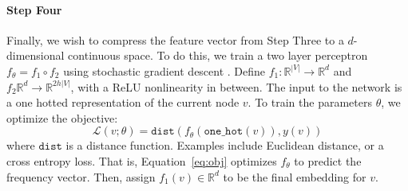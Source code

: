 \documentclass[11pt,a4paper]{article}
\begin{document}
\paragraph{Step Four} Finally, we wish to compress the feature vector from Step Three to a $d$-dimensional continuous space. To do this, we train a two layer perceptron $f_\theta = f_1 \circ f_2$ using stochastic gradient descent \citep{goodfellow2016deep,kingma2014adam}. Define $f_1: \mathbb{R}^{|V|} \rightarrow \mathbb{R}^d$ and $f_2 \mathbb{R}^d \rightarrow \mathbb{R}^{2h|V|}$, with a ReLU nonlinearity in between. The input to the network is a one hotted representation of the current node $v$.
To train the parameters $\theta$, we optimize the objective:
\begin{equation}
  \mathcal{L}(v; \theta) = \texttt{dist}(f_\theta(\texttt{one\_hot}(v)), y(v))
  \label{eq:obj}
\end{equation}
where $\texttt{dist}$ is a distance function. Examples include Euclidean distance, or a cross entropy loss.
That is, Equation~\ref{eq:obj} optimizes $f_\theta$ to predict the frequency vector. Then, assign $f_1(v) \in \mathbb{R}^d$ to be the final embedding for $v$.\newline
\end{document}

